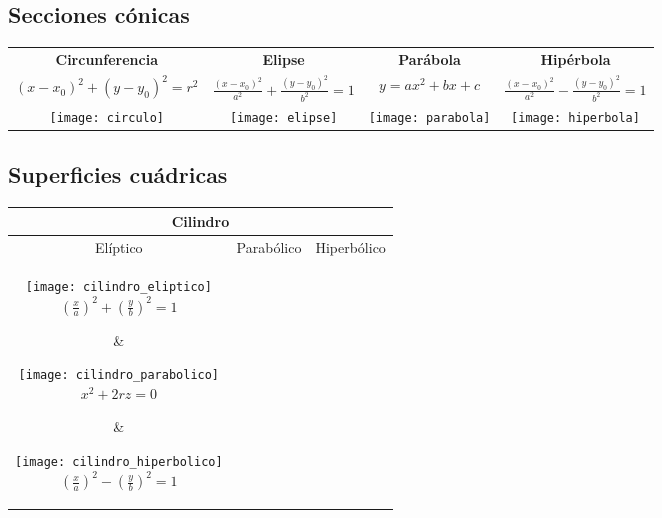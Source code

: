 \documentclass[twoside]{article}
\numberwithin{equation}{section}
\numberwithin{figure}{section}
\numberwithin{table}{section}
\begin{document}
		\subsection{Secciones cónicas}
			
			\begin{tabular}{c c c c}
				\textbf{Circunferencia} & \textbf{Elipse} & \textbf{Parábola} & \textbf{Hipérbola} \\
				$(x-x_0)^2+(y-y_0)^2=r^2$ & $\frac{(x-x_0)^2}{a^2}+\frac{(y-y_0)^2}{b^2}=1$ & $y=ax^2+bx+c$ & $\frac{(x-x_0)^2}{a^2}-\frac{(y-y_0)^2}{b^2}=1$ \\
				\texttt{[image: circulo]} & \texttt{[image: elipse]} & \texttt{[image: parabola]} & \texttt{[image: hiperbola]}
			\end{tabular}

		\subsection{Superficies cuádricas}
			
			\begin{center}
					\begin{tabular}{c c c}
						\multicolumn{3}{c}{\textbf{Cilindro}} \\ 
						\toprule
						Elíptico & Parabólico & Hiperbólico \\ 
						
						\parbox{5cm}{\begin{center}\texttt{[image: cilindro\_eliptico]} \\
											$\left(\frac{x}{a}\right)^2+\left(\frac{y}{b}\right)^2=1$	\end{center}} &
						\parbox{5cm}{\begin{center}	\texttt{[image: cilindro\_parabolico]} \\
											$x^2+2rz=0$\end{center}} &
						\parbox{5cm}{\begin{center}	\texttt{[image: cilindro\_hiperbolico]} \\
											$\left(\frac{x}{a}\right)^2-\left(\frac{y}{b}\right)^2=1$\end{center}} \\
							
					\end{tabular} 
				\end{center}				
		
\end{document}

